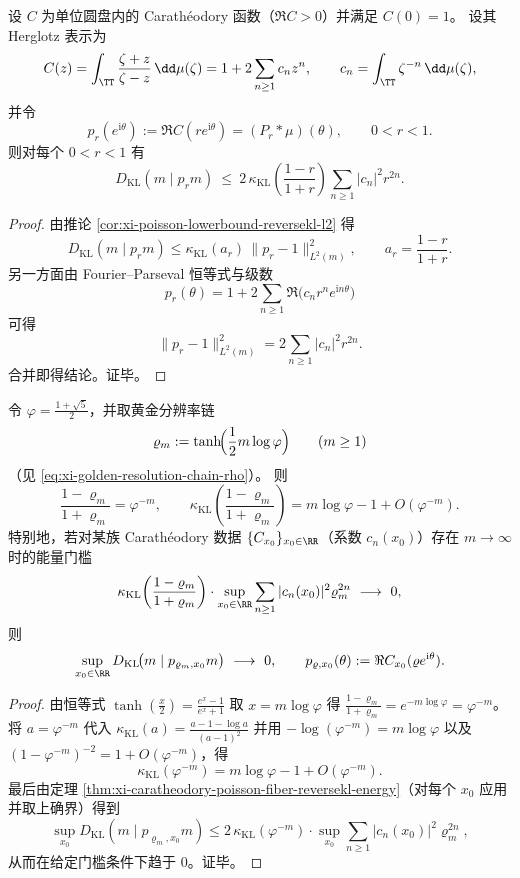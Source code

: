 \begin{theorem}\label{thm:xi-caratheodory-poisson-fiber-reversekl-energy}
设 \(C\) 为单位圆盘内的 Carath\'eodory 函数（\(\Re C>0\)）并满足 \(C(0)=1\)。
设其 Herglotz 表示为
\[
C(z)=\int_{\TT}\frac{\zeta+z}{\zeta-z}\,\dd\mu(\zeta)
=1+2\sum_{n\ge 1}c_n z^n,
\qquad
c_n=\int_{\TT}\zeta^{-n}\,\dd\mu(\zeta),
\]
并令
\[
p_r(e^{\mathrm i\theta}):=\Re C(re^{\mathrm i\theta})=(P_r*\mu)(\theta),\qquad 0<r<1.
\]
则对每个 \(0<r<1\) 有
\[
D_{\mathrm{KL}}(m\mid p_r m)
\ \le\
2\,\kappa_{\mathrm{KL}}\!\left(\frac{1-r}{1+r}\right)
\sum_{n\ge 1}|c_n|^2r^{2n}.
\]
\end{theorem}
\begin{proof}
由推论 \ref{cor:xi-poisson-lowerbound-reversekl-l2} 得
\[
D_{\mathrm{KL}}(m\mid p_r m)\le \kappa_{\mathrm{KL}}(a_r)\,\|p_r-1\|_{L^2(m)}^2,\qquad a_r=\frac{1-r}{1+r}.
\]
另一方面由 Fourier--Parseval 恒等式与级数
\[
p_r(\theta)=1+2\sum_{n\ge 1}\Re\bigl(c_n r^n e^{\mathrm i n\theta}\bigr)
\]
可得
\[
\|p_r-1\|_{L^2(m)}^2
=2\sum_{n\ge 1}|c_n|^2r^{2n}.
\]
合并即得结论。证毕。
\end{proof}

\begin{corollary}[黄金分辨率链上的线性对数门槛]\label{cor:xi-golden-chain-reversekl-log-barrier}
令 \(\varphi=\frac{1+\sqrt5}{2}\)，并取黄金分辨率链
\[
\varrho_m:=\tanh\!\Bigl(\frac12 m\log\varphi\Bigr)\qquad(m\ge 1)
\]
（见 \eqref{eq:xi-golden-resolution-chain-rho}）。
则
\[
\frac{1-\varrho_m}{1+\varrho_m}=\varphi^{-m},
\qquad
\kappa_{\mathrm{KL}}\!\left(\frac{1-\varrho_m}{1+\varrho_m}\right)
=m\log\varphi-1+O(\varphi^{-m}).
\]
特别地，若对某族 Carath\'eodory 数据 \(\{C_{x_0}\}_{x_0\in\RR}\)（系数 \(c_n(x_0)\)）存在 \(m\to\infty\) 时的能量门槛
\[
\kappa_{\mathrm{KL}}\!\left(\frac{1-\varrho_m}{1+\varrho_m}\right)\cdot
\sup_{x_0\in\RR}\sum_{n\ge 1}|c_n(x_0)|^2\varrho_m^{2n}\ \longrightarrow\ 0,
\]
则
\[
\sup_{x_0\in\RR}D_{\mathrm{KL}}\!\bigl(m\mid p_{\varrho_m,x_0}m\bigr)\ \longrightarrow\ 0,
\qquad
p_{\varrho,x_0}(\theta):=\Re C_{x_0}(\varrho e^{\mathrm i\theta}).
\]
\end{corollary}
\begin{proof}
由恒等式 \(\tanh(\tfrac{x}{2})=\frac{e^x-1}{e^x+1}\) 取 \(x=m\log\varphi\) 得
\(
\frac{1-\varrho_m}{1+\varrho_m}=e^{-m\log\varphi}=\varphi^{-m}
\)。
将 \(a=\varphi^{-m}\) 代入
\(
\kappa_{\mathrm{KL}}(a)=\frac{a-1-\log a}{(a-1)^2}
\)
并用 \(-\log(\varphi^{-m})=m\log\varphi\) 以及 \((1-\varphi^{-m})^{-2}=1+O(\varphi^{-m})\)，得
\[
\kappa_{\mathrm{KL}}(\varphi^{-m})=m\log\varphi-1+O(\varphi^{-m}).
\]
最后由定理 \ref{thm:xi-caratheodory-poisson-fiber-reversekl-energy}（对每个 \(x_0\) 应用并取上确界）得到
\[
\sup_{x_0}D_{\mathrm{KL}}(m\mid p_{\varrho_m,x_0}m)
\le
2\,\kappa_{\mathrm{KL}}(\varphi^{-m})\cdot
\sup_{x_0}\sum_{n\ge 1}|c_n(x_0)|^2\varrho_m^{2n},
\]
从而在给定门槛条件下趋于 \(0\)。证毕。
\end{proof}

\endinput
